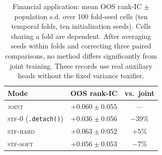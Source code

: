 \documentclass{article}
\begin{document}
\begin{table}[t]
\centering
\caption{Four scientific domains and the financial discovery application. Sample counts describe the listed experimental datasets; individual protocols specify their partitions. Controlled scientific experiments use variance-shrinkage auxiliaries. The financial application uses real heads, and the battery and NYUv2 application studies also evaluate practical reconstruction heads.}
\label{tab:domains}
\footnotesize
{}
\end{table}

\begin{table}[t]
\centering
\caption{Financial application: mean OOS rank-IC $\pm$ population s.d. over 100 fold-seed cells (ten temporal folds, ten initialization seeds). Cells sharing a fold are dependent. After averaging seeds within folds and correcting three paired comparisons, no method differs significantly from joint training. These records use real auxiliary heads without the fixed variance toxifier.}
\label{tab:finance_repair}
\footnotesize
\begin{tabular}{lcc}
\toprule
Mode & OOS rank-IC & vs.\ joint \\
\midrule
\textsc{joint} & $+0.060\pm0.055$ & --- \\
\textsc{stf-0} (\texttt{.detach()}) & $+0.036\pm0.056$ & $-39\%$ \\
\textsc{stf-hard} & $+0.063\pm0.052$ & $+5\%$ \\
\textsc{stf-soft} & $+0.056\pm0.053$ & $-7\%$ \\
\bottomrule
\end{tabular}
\end{table}
\end{document}
